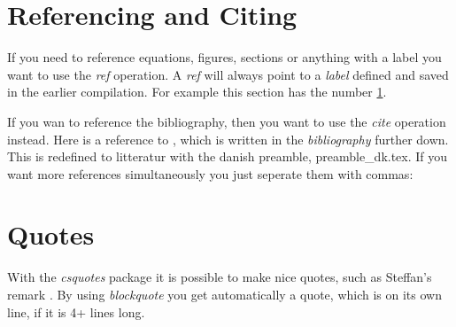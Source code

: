 \documentclass[a4, english, twoside]{article}
\begin{document}
\begin{figure}[htbp!]
    \centering
    \label{fig:ER}
\end{figure}

\section{Referencing and Citing} \label{sec:ref}
If you need to reference equations, figures, sections or anything with a label you want to use the \emph{ref} operation. A \emph{ref} will always point to a \emph{label} defined and saved in the earlier compilation. For example this section has the number \ref{sec:ref}.

If you wan to reference the bibliography, then you want to use the \emph{cite} operation instead. Here is a reference to \cite{berlog}, which is written in the \emph{bibliography} further down. This is redefined to litteratur with the danish preamble, preamble\_dk.tex. If you want more references simultaneously you just seperate them with commas: \cite{berlog, steffan}

\section{Quotes}
With the \emph{csquotes} package it is possible to make nice quotes, such as Steffan's remark . By using \emph{blockquote} you get automatically a quote, which is on its own line, if it is 4+ lines long.
\end{document}
